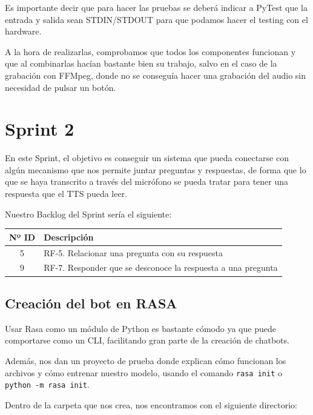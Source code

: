 Es importante decir que para hacer las pruebas se deberá indicar a PyTest que la entrada y salida sean STDIN/STDOUT para que podamos hacer el testing con el hardware.

A la hora de realizarlas, comprobamos que todos los componentes funcionan y que al combinarlas hacían bastante bien su trabajo, salvo en el caso de la grabación con FFMpeg, donde no se conseguía hacer una grabación del audio sin necesidad de pulsar un botón.

\section{Sprint 2}
En este Sprint, el objetivo es conseguir un sistema que pueda conectarse con algún mecanismo que nos permite juntar preguntas y respuestas, de forma que lo que se haya transcrito a través del micrófono se pueda tratar para tener una respuesta que el TTS pueda leer.

Nuestro Backlog del Sprint sería el siguiente:
\begin{table}[H]
	\begin{tabularx}{\textwidth}{|c|X|}
		\hline
		{\cellcolor{mintgreen}} \textbf{Nº ID} & {\cellcolor{mintgreen}} \textbf{Descripción} \\
		\hline
		5 & RF-5. Relacionar una pregunta con su respuesta\\
		\hline
		9 & RF-7. Responder que se desconoce la respuesta a una pregunta \\
		\hline
	\end{tabularx}
\end{table}

\subsection{Creación del bot en RASA}
Usar Rasa \cite{rasa} como un módulo de Python es bastante cómodo ya que puede comportarse como un CLI, facilitando gran parte de la creación de chatbots.

Además, nos dan un proyecto de prueba donde explican cómo funcionan los archivos y cómo entrenar nuestro modelo, usando el comando \texttt{rasa init} o \texttt{python -m rasa init}.

Dentro de la carpeta que nos crea, nos encontramos con el siguiente directorio:



